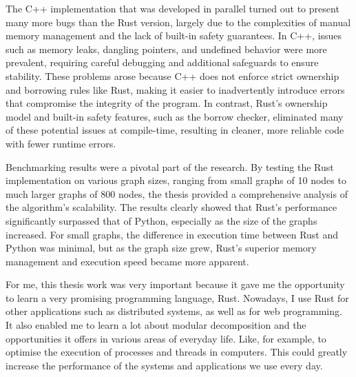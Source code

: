 The C++ implementation that was developed in parallel turned out to present many more bugs than the Rust version, largely due to the complexities of manual memory management and the lack of built-in safety guarantees.
In C++, issues such as memory leaks, dangling pointers, and undefined behavior were more prevalent, requiring careful debugging and additional safeguards to ensure stability.
These problems arose because C++ does not enforce strict ownership and borrowing rules like Rust, making it easier to inadvertently introduce errors that compromise the integrity of the program.
In contrast, Rust’s ownership model and built-in safety features, such as the borrow checker, eliminated many of these potential issues at compile-time, resulting in cleaner, more reliable code with fewer runtime errors.

Benchmarking results were a pivotal part of the research.
By testing the Rust implementation on various graph sizes, ranging from small graphs of 10 nodes to much larger graphs of 800 nodes, the thesis provided a comprehensive analysis of the algorithm’s scalability.
The results clearly showed that Rust’s performance significantly surpassed that of Python, especially as the size of the graphs increased.
For small graphs, the difference in execution time between Rust and Python was minimal, but as the graph size grew, Rust’s superior memory management and execution speed became more apparent.

For me, this thesis work was very important because it gave me the opportunity to learn a very promising programming language, Rust.
Nowadays, I use Rust for other applications such as distributed systems, as well as for web programming.
It also enabled me to learn a lot about modular decomposition and the opportunities it offers in various areas of everyday life.
Like, for example, to optimise the execution of processes and threads in computers.
This could greatly increase the performance of the systems and applications we use every day.

